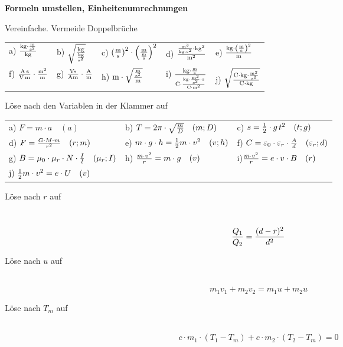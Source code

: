 \documentclass[a4paper]{article}
\begin{document}
{\bf Formeln umstellen, Einheitenumrechnungen}
\begin{enumerate}[1.]
{\bf \item Vereinfache. Vermeide Doppelbrüche}

\renewcommand{\arraystretch}{2}
\begin{tabular}{p{3 cm}p{3 cm}p{3 cm}p{3 cm}p{3 cm}}
	a) $ { \SI{}{\kilogram\cdot{\meter\over \second^2}} \over \SI{}{\kilogram}} $ & b) $\sqrt{\SI{}{\kilogram} \over \SI{}{\kilogram\over {\second^2}} }$ & c) $ \SI{}{({\meter\over \second})}^2 \cdot \left({\SI{}{\meter} \over \SI{}{\meter\over \second}}\right)^2$ & d) $ {\SI{}{{\meter^3}\over \kilogram\cdot{\second^2}} \cdot \SI{}{\kilogram^2} \over \SI{}{\meter^2}}$ & e) ${\SI{}{\kilogram} \cdot \left(\SI{}{\meter\over \second}\right)^2 \over \SI{}{\meter}}$\\ 
	f) ${ \SI{}{\ampere\second} \over \SI{}{\volt\meter}} \cdot {\SI{}{{\meter^2}\over \meter} }$ & g) $ \SI{}{\volt\second\over \ampere\meter} \cdot \SI{}{\ampere\over \meter}$ & h) $\SI{}{\meter} \cdot \sqrt{ \SI{}{\meter\over {\second^2}} \over\SI{}{\meter} }$ & i) ${\SI{}{\kilogram\cdot{\meter\over \second}}\over \SI{}{\coulomb} \cdot {\SI{}{\kilogram\cdot{\meter^2\over \second^2}} \cdot \SI{}{\second} \over \SI{}{\coulomb\cdot\meter^2}}}$ & j) $\sqrt{\SI{}{\coulomb} \cdot {\SI{}{\kilogram\cdot{\meter^2\over \second^2}}} \over \SI{}{\coulomb\cdot\kilogram}}$\\
	
\end{tabular}
 
{\bf \item Löse nach den Variablen in der Klammer auf}

\renewcommand{\arraystretch}{2}
\begin{tabular}{p{5.5 cm}p{5.5 cm}p{5.5 cm}}
	a) $ {F=m\cdot a } \quad(a)$ & b) $T=2 \pi \cdot \sqrt{{m\over D}}\quad(m; D)$ & c) $ s = {1 \over 2} \cdot g \, t^2 \quad (t; g)$ \\
	 d) $F={G \cdot M \cdot m \over r^2} \quad (r; m)$ &
	e) $m\cdot g \cdot h ={1\over 2}m\cdot v^2 \quad (v; h)$ & f) $C= \varepsilon_0 \cdot \varepsilon_r \cdot {A \over d} \quad(\varepsilon_r; d)$ \\
	 g) $B= \mu_0 \cdot \mu_r \cdot N \cdot {I \over l}\quad (\mu_r; I)$ & 
	 h) $ {m \cdot v^2 \over r}= m \cdot g \quad (v) $ & i)$ {m \cdot v^2 \over r} = e \cdot v \cdot B \quad (r) $ \\
	 j) ${1 \over 2} m \cdot v^2 = e \cdot U \quad (v)$
\end{tabular}

{\bf \item Löse nach $r$ auf}\\
$$ {Q_1 \over Q_2}= {(d-r)^2 \over d^2}$$

{\bf \item Löse nach $u$ auf}\\
$$m_1v_1 + m_2v_2 = m_1u + m_2u$$

{\bf \item Löse nach $T_m$ auf}\\
$$c\cdot m_1 \cdot(T_1-T_m) + c \cdot m_2 \cdot ( T_2 - T_m) = 0 $$

\end{enumerate} 
\end{document}
